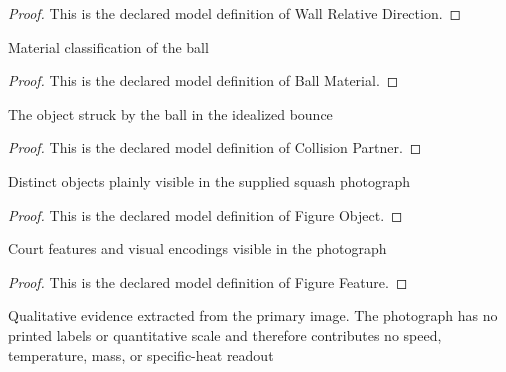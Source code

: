 \begin{proof}
  This is the declared model definition of Wall Relative Direction.
\end{proof}
\begin{definition}
  \label{def:physics:phyx-mini-0490:phyxminiproblems-problemphyxmini0490-ballmaterial}
  Material classification of the ball
\end{definition}
\begin{proof}
  This is the declared model definition of Ball Material.
\end{proof}
\begin{definition}
  \label{def:physics:phyx-mini-0490:phyxminiproblems-problemphyxmini0490-collisionpartner}
  The object struck by the ball in the idealized bounce
\end{definition}
\begin{proof}
  This is the declared model definition of Collision Partner.
\end{proof}
\begin{definition}
  \label{def:physics:phyx-mini-0490:phyxminiproblems-problemphyxmini0490-figureobject}
  Distinct objects plainly visible in the supplied squash photograph
\end{definition}
\begin{proof}
  This is the declared model definition of Figure Object.
\end{proof}
\begin{definition}
  \label{def:physics:phyx-mini-0490:phyxminiproblems-problemphyxmini0490-figurefeature}
  Court features and visual encodings visible in the photograph
\end{definition}
\begin{proof}
  This is the declared model definition of Figure Feature.
\end{proof}
\begin{definition}
  \label{def:physics:phyx-mini-0490:phyxminiproblems-problemphyxmini0490-squashgamefigure}
  Qualitative evidence extracted from the primary image. The photograph has no printed labels or quantitative scale and therefore contributes no speed, temperature, mass, or specific-heat readout
\end{definition}
